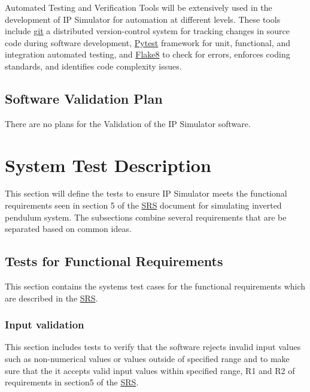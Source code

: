 \documentclass[12pt, titlepage]{article}
\begin{document}
Automated Testing and Verification Tools will be extensively used in the development of IP Simulator for automation at different levels. These tools include \href{https://github.com/MinMah23/CAS741-Project}{git} a distributed version-control system for tracking changes in source code during software development, \href{https://docs.pytest.org/en/7.2.x/}{Pytest} framework for unit, functional, and integration automated testing, and \href{https://flake8.pycqa.org/en/latest/}{Flake8} to check for errors, enforces coding standards, and identifies code complexity issues.

\subsection{Software Validation Plan}

There are no plans for the Validation of the IP Simulator software.

\section{System Test Description}\label{test}
This section will define the tests to ensure IP Simulator meets the functional requirements seen in section 5 of the \href{https://github.com/MinMah23/CAS741-Project/tree/main/docs/SRS/SRS.pdf}{SRS} document for simulating inverted pendulum system. The subsections combine several requirements that are be separated based on common ideas.

\subsection{Tests for Functional Requirements}
This section contains the systems test cases for the functional requirements which are described in the  \href{https://github.com/MinMah23/CAS741-Project/tree/main/docs/SRS/SRS.pdf}{SRS}.

\subsubsection{Input validation \label{inp_val}}
This section includes tests to verify that the software rejects invalid input values such as non-numerical values or values outside of specified range and to make sure that the it accepts valid input values within specified range, R1 and R2 of requirements in section5 of the  \href{https://github.com/MinMah23/CAS741-Project/tree/main/docs/SRS/SRS.pdf}{SRS}.
\end{document}
